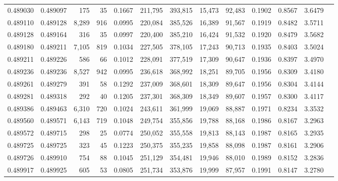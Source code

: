 \begin{tabular}{rrrrrrrrrrrrr}
0.489030 & 0.489097 &   175 &    35 &                                     0.1667 & 211,795 & 393,815 &  15,473 &  92,483 & 0.1902 & 0.8567 & 3.6479 \\
0.489110 & 0.489128 & 8,289 &   916 &                                     0.0995 & 220,084 & 385,526 &  16,389 &  91,567 & 0.1919 & 0.8482 & 3.5711 \\
0.489128 & 0.489164 &   316 &    35 &                                     0.0997 & 220,400 & 385,210 &  16,424 &  91,532 & 0.1920 & 0.8479 & 3.5682 \\
0.489180 & 0.489211 & 7,105 &   819 &                                     0.1034 & 227,505 & 378,105 &  17,243 &  90,713 & 0.1935 & 0.8403 & 3.5024 \\
0.489211 & 0.489226 &   586 &    66 &                                     0.1012 & 228,091 & 377,519 &  17,309 &  90,647 & 0.1936 & 0.8397 & 3.4970 \\
0.489236 & 0.489236 & 8,527 &   942 &                                     0.0995 & 236,618 & 368,992 &  18,251 &  89,705 & 0.1956 & 0.8309 & 3.4180 \\
0.489261 & 0.489279 &   391 &    58 &                                     0.1292 & 237,009 & 368,601 &  18,309 &  89,647 & 0.1956 & 0.8304 & 3.4144 \\
0.489281 & 0.489318 &   292 &    40 &                                     0.1205 & 237,301 & 368,309 &  18,349 &  89,607 & 0.1957 & 0.8300 & 3.4117 \\
0.489386 & 0.489463 & 6,310 &   720 &                                     0.1024 & 243,611 & 361,999 &  19,069 &  88,887 & 0.1971 & 0.8234 & 3.3532 \\
0.489560 & 0.489571 & 6,143 &   719 &                                     0.1048 & 249,754 & 355,856 &  19,788 &  88,168 & 0.1986 & 0.8167 & 3.2963 \\
0.489572 & 0.489715 &   298 &    25 &                                     0.0774 & 250,052 & 355,558 &  19,813 &  88,143 & 0.1987 & 0.8165 & 3.2935 \\
0.489725 & 0.489725 &   323 &    45 &                                     0.1223 & 250,375 & 355,235 &  19,858 &  88,098 & 0.1987 & 0.8161 & 3.2906 \\
0.489726 & 0.489910 &   754 &    88 &                                     0.1045 & 251,129 & 354,481 &  19,946 &  88,010 & 0.1989 & 0.8152 & 3.2836 \\
0.489917 & 0.489925 &   605 &    53 &                                     0.0805 & 251,734 & 353,876 &  19,999 &  87,957 & 0.1991 & 0.8147 & 3.2780 \\

\end{tabular}
